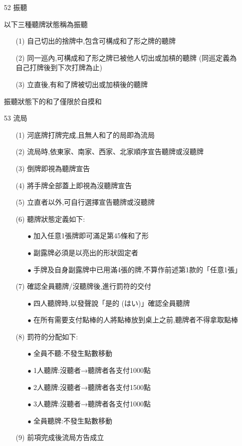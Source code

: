 \documentclass[a4paper,12pt]{article}
\begin{document}
\begin{itemize}
    \item[52] 振聽
    \item[] 以下三種聽牌狀態稱為振聽
    \begin{itemize}
        \item[(1)] 自己切出的捨牌中,包含可構成和了形之牌的聽牌
        \item[(2)] 同一巡內,可構成和了形之牌已被他人切出或加槓的聽牌 (同巡定義為自己打牌後到下次打牌為止) 
        \item[(3)] 立直後,有和了牌被切出或加槓後的聽牌
    \end{itemize}
    \item[] 振聽狀態下的和了僅限於自摸和
    \item[53] 流局
     \begin{itemize}
        \item[(1)] 河底牌打牌完成,且無人和了的局即為流局
        \item[(2)] 流局時,依東家、南家、西家、北家順序宣告聽牌或沒聽牌
        \item[(3)] 倒牌即視為聽牌宣告
        \item[(4)] 將手牌全部蓋上即視為沒聽牌宣告
        \item[(5)] 立直者以外,可自行選擇宣告聽牌或沒聽牌
        \item[(6)] 聽牌狀態定義如下:
        \begin{itemize}
            \item[$\bullet$] 加入任意1張牌即可滿足第45條和了形
            \item[$\bullet$] 副露牌必須是以亮出的形狀固定者
            \item[$\bullet$] 手牌及自身副露牌中已用滿4張的牌,不算作前述第1款的「任意1張」
        \end{itemize}
        \item[(7)] 確認全員聽牌/沒聽牌後,進行罰符的交付
        \begin{itemize}
            \item[$\bullet$] 四人聽牌時,以發聲說「是的 (はい)」確認全員聽牌
            \item[$\bullet$] 在所有需要支付點棒的人將點棒放到桌上之前,聽牌者不得拿取點棒
        \end{itemize}
        \item[(8)] 罰符的分配如下: 
        \begin{itemize}
            \item[$\bullet$] 全員不聽:不發生點數移動
            \item[$\bullet$] 1人聽牌:沒聽者→聽牌者各支付1000點
            \item[$\bullet$] 2人聽牌:沒聽者→聽牌者各支付1500點
            \item[$\bullet$] 3人聽牌:沒聽者→聽牌者各支付1000點
            \item[$\bullet$] 全員聽牌:不發生點數移動
        \end{itemize}
        \item[(9)] 前項完成後流局方告成立
    \end{itemize}
\end{itemize}
\end{document}
